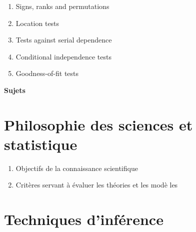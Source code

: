\documentclass[titlepage,11pt,amstex]{article}
\begin{document}
\begin{enumerate}
\item Signs, ranks and permutations

\item Location tests

\item Tests against serial dependence

\item Conditional independence tests

\item Goodness-of-fit tests
\end{enumerate}

\begin{center}
\newpage \textbf{Sujets}

\quad
\end{center}

\section{\textbf{Philosophie des sciences et statistique}}

\begin{enumerate}
\item Objectifs de la connaissance scientifique

\item Crit\`{e}res servant \`{a} \'{e}valuer les th\'{e}ories et les mod\`{e}%
les
\end{enumerate}

\section{\textbf{Techniques d'inf\'{e}rence}}
\end{document}
